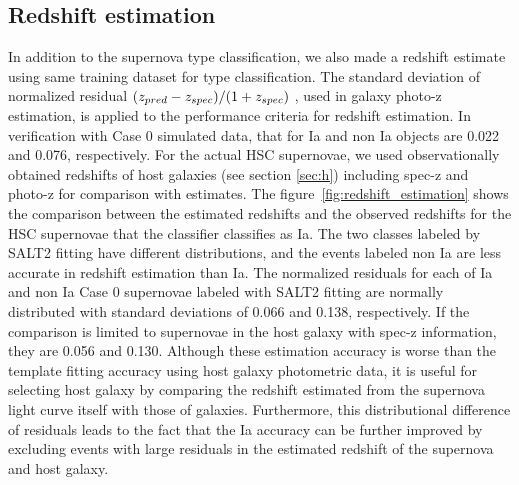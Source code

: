 \documentclass[useamsfonts]{pasj01}
\begin{document}
\subsection{Redshift estimation}
%
In addition to the supernova type classification,
we also made a redshift estimate using same training dataset for type classification.
The standard deviation of normalized residual $(z_{\rm pred}-z_{\rm spec})/(1+z_{\rm spec})$ \citep{Salvato_2009,Salvato_2019}, used in galaxy photo-z estimation, is applied to the performance criteria for redshift estimation.
In verification with Case 0 simulated data, that for Ia and non Ia objects are 0.022 and 0.076, respectively.
For the actual HSC supernovae, we used observationally obtained redshifts of host galaxies (see section \ref{sec:h}) including spec-z and photo-z for comparison with estimates.
The figure\ \ref{fig:redshift_estimation} shows the comparison between the estimated redshifts and the observed redshifts for the HSC supernovae that the classifier classifies as Ia.
The two classes labeled by SALT2 fitting have different distributions, and the events labeled non Ia are less accurate in redshift estimation than Ia.
The normalized residuals for each of Ia and non Ia Case 0 supernovae labeled with SALT2 fitting are normally distributed with standard deviations of 0.066 and 0.138, respectively.
If the comparison is limited to supernovae in the host galaxy with spec-z information, they are 0.056 and 0.130.
Although these estimation accuracy is worse than the template fitting accuracy using host galaxy photometric data, it is useful for selecting host galaxy by comparing the redshift estimated from the supernova light curve itself with those of galaxies.
Furthermore, this distributional difference of residuals leads to the fact that the Ia accuracy can be further improved by excluding events with large residuals in the estimated redshift of the supernova and host galaxy.
%
\end{document}
